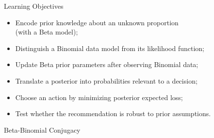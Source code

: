 \documentclass[aspectratio=43,11pt]{beamer}
\begin{document}
  \begin{frame}{Learning Objectives}
    \begin{itemize}
      \item Encode prior knowledge about an unknown proportion\\(with a Beta model);
      \item Distinguish a Binomial data model from its likelihood function;
      \item Update Beta prior parameters after observing Binomial data;
      \item Translate a posterior into probabilities relevant to a decision;
      \item Choose an action by minimizing posterior expected loss;
      \item Test whether the recommendation is robust to prior assumptions.
    \end{itemize}
  \end{frame}
  
  \begin{frame}
    \begin{block}{Beta-Binomial Conjugacy}
      \begin{center}
      \end{center}
    \end{block}
  \end{frame}
\end{document}
